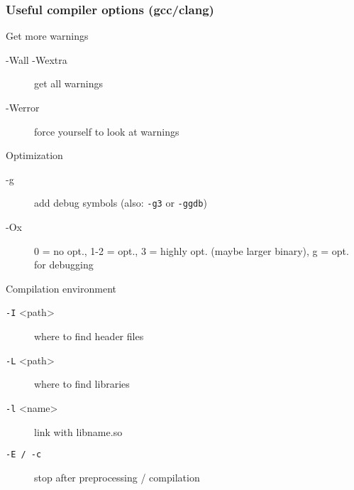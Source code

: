 \begin{frame}[fragile]
  \frametitle{Useful compiler options (gcc/clang)}
  \begin{block}{Get more warnings}
    \begin{description}
      \item[-Wall -Wextra] get all warnings
      \item[-Werror] force yourself to look at warnings
    \end{description}
  \end{block}
  \begin{block}{Optimization}
    \begin{description}
      \item[-g] add debug symbols (also: \texttt{-g3} or \texttt{-ggdb})
      \item[-Ox] 0 = no opt., 1-2 = opt., 3 = highly opt. (maybe larger binary), g = opt. for debugging
    \end{description}
  \end{block}
  \begin{block}{Compilation environment}
    \begin{description}
      \item[\texttt{-I} \textless{}path\textgreater] where to find header files
      \item[\texttt{-L} \textless{}path\textgreater] where to find libraries
      \item[\texttt{-l} \textless{}name\textgreater] link with libname.so
      \item[\texttt{-E / -c}] stop after preprocessing / compilation
    \end{description}
  \end{block}
\end{frame}

